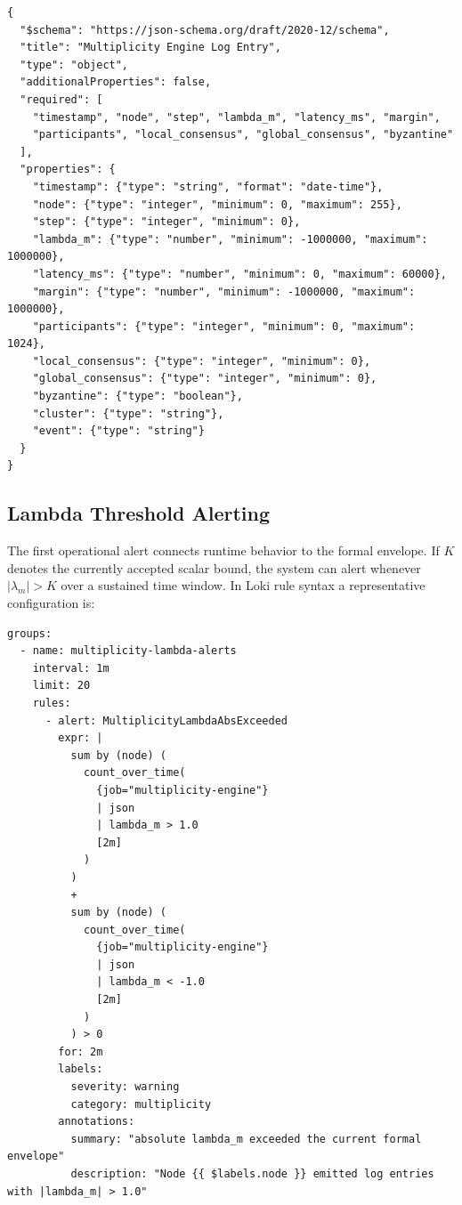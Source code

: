 \documentclass[11pt]{article}
\begin{document}
\begin{verbatim}
{
  "$schema": "https://json-schema.org/draft/2020-12/schema",
  "title": "Multiplicity Engine Log Entry",
  "type": "object",
  "additionalProperties": false,
  "required": [
    "timestamp", "node", "step", "lambda_m", "latency_ms", "margin",
    "participants", "local_consensus", "global_consensus", "byzantine"
  ],
  "properties": {
    "timestamp": {"type": "string", "format": "date-time"},
    "node": {"type": "integer", "minimum": 0, "maximum": 255},
    "step": {"type": "integer", "minimum": 0},
    "lambda_m": {"type": "number", "minimum": -1000000, "maximum": 1000000},
    "latency_ms": {"type": "number", "minimum": 0, "maximum": 60000},
    "margin": {"type": "number", "minimum": -1000000, "maximum": 1000000},
    "participants": {"type": "integer", "minimum": 0, "maximum": 1024},
    "local_consensus": {"type": "integer", "minimum": 0},
    "global_consensus": {"type": "integer", "minimum": 0},
    "byzantine": {"type": "boolean"},
    "cluster": {"type": "string"},
    "event": {"type": "string"}
  }
}
\end{verbatim}

\subsection{Lambda Threshold Alerting}
The first operational alert connects runtime behavior to the formal envelope. If $K$ denotes the currently accepted scalar bound, the system can alert whenever $|\lambda_m| > K$ over a sustained time window. In Loki rule syntax a representative configuration is:

\begin{verbatim}
groups:
  - name: multiplicity-lambda-alerts
    interval: 1m
    limit: 20
    rules:
      - alert: MultiplicityLambdaAbsExceeded
        expr: |
          sum by (node) (
            count_over_time(
              {job="multiplicity-engine"}
              | json
              | lambda_m > 1.0
              [2m]
            )
          )
          +
          sum by (node) (
            count_over_time(
              {job="multiplicity-engine"}
              | json
              | lambda_m < -1.0
              [2m]
            )
          ) > 0
        for: 2m
        labels:
          severity: warning
          category: multiplicity
        annotations:
          summary: "absolute lambda_m exceeded the current formal envelope"
          description: "Node {{ $labels.node }} emitted log entries with |lambda_m| > 1.0"
\end{verbatim}
\end{document}
